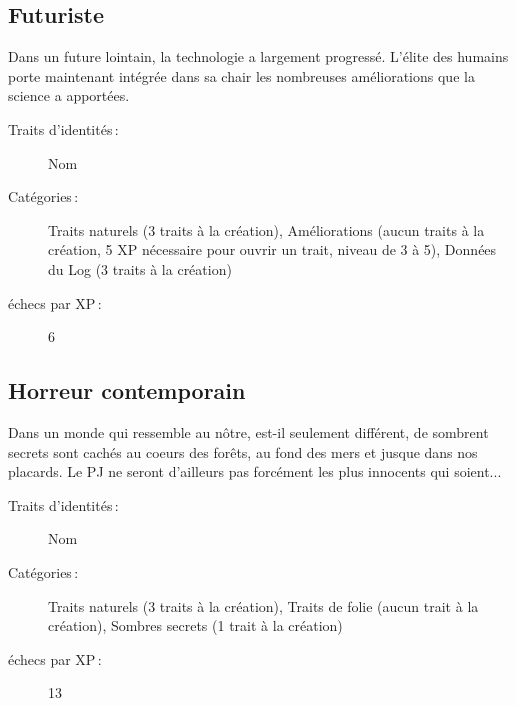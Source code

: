\documentclass[a4paper,10pt,twoside,twocolumn]{article}
\begin{document}
 \subsection{Futuriste}
 
 Dans un future lointain, la technologie a largement progressé. L'élite des humains porte maintenant intégrée dans sa chair les nombreuses améliorations que la science a apportées.
 
 \begin{description}
  \item [Traits d'identités\,:] Nom
  \item [Catégories\,:] Traits naturels (3 traits à la création), Améliorations (aucun traits à la création, 5 XP nécessaire pour ouvrir un trait, niveau de 3 à 5), Données du Log (3 traits à la création)
  \item [échecs par XP\,:] 6
 \end{description}
 
 \subsection{Horreur contemporain}
 
 Dans un monde qui ressemble au nôtre, est-il seulement différent, de sombrent secrets sont cachés au coeurs des forêts, au fond des mers et jusque dans nos placards. Le PJ ne seront d'ailleurs pas forcément les plus innocents qui soient...
 
 \begin{description}
  \item [Traits d'identités\,:] Nom
  \item [Catégories\,:] Traits naturels (3 traits à la création), Traits de folie (aucun trait à la création), Sombres secrets (1 trait à la création)
  \item [échecs par XP\,:] 13
 \end{description}
 
\end{document}
